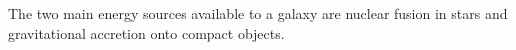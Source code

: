 The two main energy sources available to a galaxy are nuclear fusion in stars and gravitational accretion onto compact objects. 